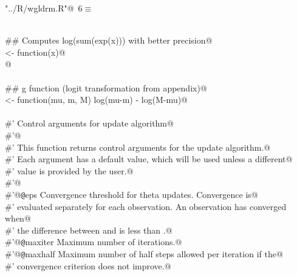 \documentclass[reqno]{amsart}
\renewcommand{\NWtarget}[2]{\hypertarget{#1}{#2}}
\begin{document}
\begin{flushleft} \small\label{scrap3}\raggedright\small
\NWtarget{nuweb6}{} \verb@"../R/wgldrm.R"@\nobreak\ {\footnotesize {6}}$\equiv$
\vspace{-1ex}
\begin{list}{}{} \item
\mbox{}\verb@@\\
\mbox{}\verb@## Computes log(sum(exp(x))) with better precision@\\
\mbox{}\verb@logSumExp <- function(x)@\\
\mbox{}@\\
\mbox{}\verb@@\\
\mbox{}\verb@## g function (logit transformation from appendix)@\\
\mbox{}\verb@g <- function(mu, m, M) log(mu-m) - log(M-mu)@\\
\mbox{}\verb@@\\
\mbox{}\verb@#' Control arguments for \eqn{\theta} update algorithm@\\
\mbox{}\verb@#'@\\
\mbox{}\verb@#' This function returns control arguments for the \eqn{\theta} update algorithm.@\\
\mbox{}\verb@#' Each argument has a default value, which will be used unless a different@\\
\mbox{}\verb@#' value is provided by the user.@\\
\mbox{}\verb@#'@\\
\mbox{}\verb@#'@{\tt @}\verb@param eps Convergence threshold for theta updates. Convergence is@\\
\mbox{}\verb@#' evaluated separately for each observation. An observation has converged when@\\
\mbox{}\verb@#' the difference between  and \eqn{\mu} is less than .@\\
\mbox{}\verb@#'@{\tt @}\verb@param maxiter Maximum number of iterations.@\\
\mbox{}\verb@#'@{\tt @}\verb@param maxhalf Maximum number of half steps allowed per iteration if the@\\
\mbox{}\verb@#' convergence criterion does not improve.@\\

\end{list}
\end{flushleft}
\end{document}

